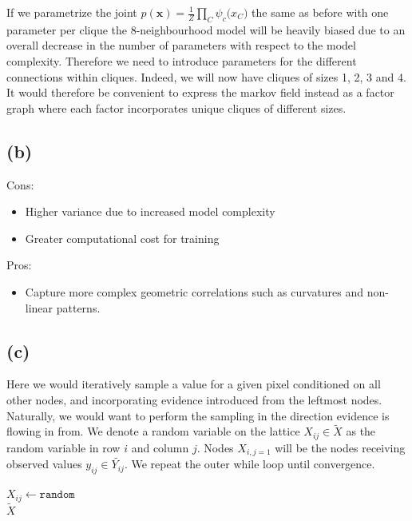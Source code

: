 \documentclass[11pt]{amsart}
\newcommand{\vek}[1]{\mathbf{#1}}
\begin{document}
If we parametrize the joint $p(\vek{x}) = \frac{1}{Z} \prod_C \psi_{c}\vek(x_C)$ the same as before with one parameter per clique the 8-neighbourhood model will be heavily biased due to an overall decrease in the number of parameters with respect to the model complexity. Therefore we need to introduce parameters for the different connections within cliques. Indeed, we will now have cliques of sizes 1, 2, 3 and 4. It would therefore be convenient to express the markov field instead as a factor graph where each factor incorporates unique cliques of different sizes. 

\subsection{(b)}

Cons:
\begin{itemize}
	\item Higher variance due to increased model complexity
	\item Greater computational cost for training
\end{itemize}
Pros:
\begin{itemize}
	\item Capture more complex geometric correlations such as curvatures and non-linear patterns.
\end{itemize}

\subsection{(c)}

Here we would iteratively sample a value for a given pixel conditioned on all other nodes, and incorporating evidence introduced from the leftmost nodes. Naturally, we would want to perform the sampling in the direction evidence is flowing in from. We denote a random variable on the lattice $X_{ij} \in \tilde{X}$ as the random variable in row $i$ and column $j$. Nodes $X_{i,j=1}$ will be the nodes receiving observed values $y_{ij} \in \tilde{Y_{ij}}$. We repeat the outer while loop until convergence.

\IncMargin{1em}
\begin{algorithm}[H]

	
	$X_{ij} \leftarrow \texttt{random}$\\
	\Return $\tilde{X}$

\end{algorithm}
\end{document}
